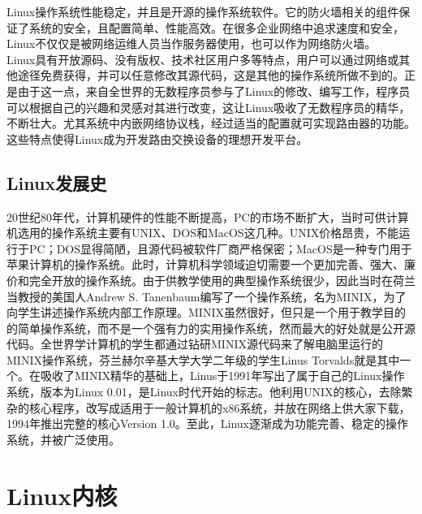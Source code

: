 \documentclass[12pt, openany, oneside]{book}
\begin{document}
Linux操作系统性能稳定，并且是开源的操作系统软件。它的防火墙相关的组件保证了系统的安全，且配置简单、性能高效。在很多企业网络中追求速度和安全，Linux不仅仅是被网络运维人员当作服务器使用，也可以作为网络防火墙。\\

Linux具有开放源码、没有版权、技术社区用户多等特点，用户可以通过网络或其他途径免费获得，并可以任意修改其源代码，这是其他的操作系统所做不到的。正是由于这一点，来自全世界的无数程序员参与了Linux的修改、编写工作，程序员可以根据自己的兴趣和灵感对其进行改变，这让Linux吸收了无数程序员的精华，不断壮大。尤其系统中内嵌网络协议栈，经过适当的配置就可实现路由器的功能。这些特点使得Linux成为开发路由交换设备的理想开发平台。\\

\subsection{Linux发展史}

20世纪80年代，计算机硬件的性能不断提高，PC的市场不断扩大，当时可供计算机选用的操作系统主要有UNIX、DOS和MacOS这几种。UNIX价格昂贵，不能运行于PC；DOS显得简陋，且源代码被软件厂商严格保密；MacOS是一种专门用于苹果计算机的操作系统。此时，计算机科学领域迫切需要一个更加完善、强大、廉价和完全开放的操作系统。由于供教学使用的典型操作系统很少，因此当时在荷兰当教授的美国人Andrew S. Tanenbaum编写了一个操作系统，名为MINIX，为了向学生讲述操作系统内部工作原理。MINIX虽然很好，但只是一个用于教学目的的简单操作系统，而不是一个强有力的实用操作系统，然而最大的好处就是公开源代码。全世界学计算机的学生都通过钻研MINIX源代码来了解电脑里运行的MINIX操作系统，芬兰赫尔辛基大学大学二年级的学生Linus Torvalds就是其中一个。在吸收了MINIX精华的基础上，Linus于1991年写出了属于自己的Linux操作系统，版本为Linux 0.01，是Linux时代开始的标志。他利用UNIX的核心，去除繁杂的核心程序，改写成适用于一般计算机的x86系统，并放在网络上供大家下载，1994年推出完整的核心Version 1.0。至此，Linux逐渐成为功能完善、稳定的操作系统，并被广泛使用。\\

\newpage

\section{Linux内核}
\end{document}

